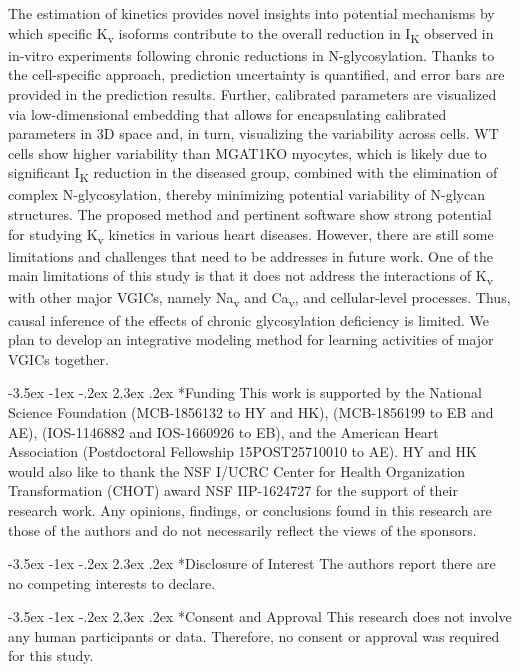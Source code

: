 \documentclass[11pt]{article}
\makeatletter
\renewcommand\section{\@startsection {section}{1}{\z@}%
                                   {-3.5ex \@plus -1ex \@minus -.2ex}%
                                   {2.3ex \@plus.2ex}%
                                   {\normalfont\fontfamily{phv}\fontsize{16}{19}\bfseries}}
\makeatother
\begin{document}
The estimation of kinetics provides novel insights into potential mechanisms by which specific K\textsubscript{v} isoforms contribute to the overall reduction in I\textsubscript{K} observed in in-vitro experiments following chronic reductions in N-glycosylation. Thanks to the cell-specific approach, prediction uncertainty is quantified, and error bars are provided in the prediction results. Further, calibrated parameters are visualized via low-dimensional embedding that allows for encapsulating calibrated parameters in 3D space and, in turn, visualizing the variability across cells. WT cells show higher variability than MGAT1KO myocytes, which is likely due to significant I\textsubscript{K} reduction in the diseased group, combined with the elimination of complex N-glycosylation, thereby minimizing potential variability of N-glycan structures. The proposed method and pertinent software show strong potential for studying K\textsubscript{v} kinetics in various heart diseases. However, there are still some limitations and challenges that need to be addresses in future work. One of the main limitations of this study is that it does not address the interactions of K\textsubscript{v} with other major VGICs, namely Na\textsubscript{v} and Ca\textsubscript{v}, and cellular-level processes. Thus, causal inference of the effects of chronic glycosylation deficiency is limited. We plan to develop an integrative modeling method for learning activities of major VGICs together.  

\section*{Funding}
This work is supported by the National Science Foundation (MCB-1856132 to HY and HK), (MCB-1856199 to EB and AE), (IOS-1146882 and IOS-1660926 to EB), and the American Heart Association (Postdoctoral Fellowship 15POST25710010 to AE). HY and HK would also like to thank the NSF I/UCRC Center for Health Organization Transformation (CHOT) award NSF IIP-1624727 for the support of their research work. Any opinions, findings, or conclusions found in this research are those of the authors and do not necessarily reflect the views of the sponsors. 

\section*{Disclosure of Interest}
The authors report there are no competing interests to declare.

\section*{Consent and Approval}
This research does not involve any human participants or data. Therefore, no consent or approval was required for this study.



\end{document}
